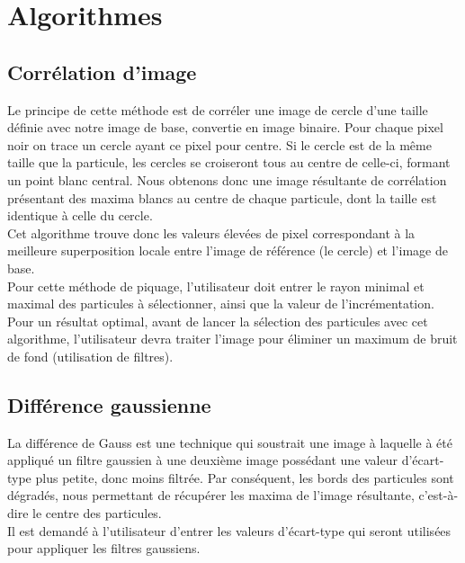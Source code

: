 \section{Algorithmes}

\subsection{Corrélation d'image}

Le principe de cette méthode est de corréler une image de cercle d'une taille définie avec notre image de base, convertie en image binaire. Pour chaque pixel noir on trace un cercle ayant ce pixel pour centre.
Si le cercle est de la m\^eme taille que la particule, les cercles se croiseront tous au centre de celle-ci, formant un point blanc central. Nous obtenons donc une image résultante de corrélation présentant des maxima blancs au centre de chaque particule, dont la taille est identique à celle du cercle.\\
Cet algorithme trouve donc les valeurs élevées de pixel correspondant à la meilleure superposition locale entre l'image de référence (le cercle) et l'image de base.\\

\noindent
Pour cette méthode de piquage, l'utilisateur doit entrer le rayon minimal et maximal des particules à sélectionner, ainsi que la valeur de l'incrémentation.\\ Pour un résultat optimal, avant de lancer la sélection des particules avec cet algorithme, l'utilisateur devra traiter l'image pour éliminer un maximum de bruit de fond (utilisation de filtres).

\subsection{Différence gaussienne}

La différence de Gauss est une technique qui soustrait une image à laquelle à été appliqué un filtre gaussien à une deuxième image possédant une valeur d'écart-type plus petite, donc moins filtrée. Par conséquent, les bords des particules sont dégradés, nous permettant de récupérer les maxima de l'image résultante, c'est-à-dire le centre des particules.\\
\noindent
Il est demandé à l'utilisateur d'entrer les valeurs d'écart-type qui seront utilisées pour appliquer les filtres gaussiens.

